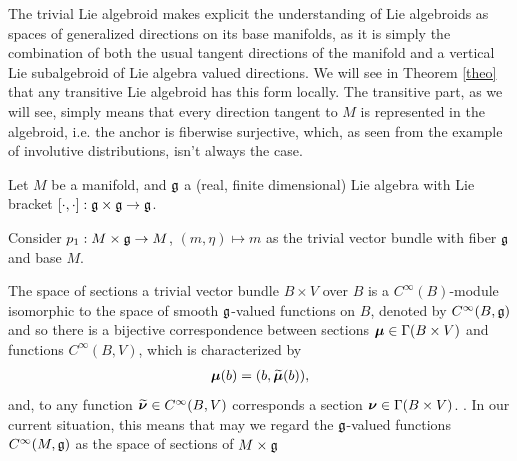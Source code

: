 The trivial Lie algebroid makes explicit the understanding of Lie algebroids as spaces of generalized directions on its base manifolds, as it is simply the combination of both the usual tangent directions of the manifold and a vertical Lie subalgebroid of Lie algebra valued directions. We will see in Theorem \ref{theo} that any transitive Lie algebroid has this form locally. The transitive part, as we will see, simply means that every direction tangent to $M$ is represented in the algebroid, i.e. the anchor is fiberwise surjective, which, as seen from the example of involutive distributions, isn't always the case.

Let $M$ be a manifold, and $\mathfrak{g}$ a (real, finite dimensional) Lie algebra with Lie bracket $[\cdot , \cdot]: \mathfrak{g} \times \mathfrak{g} \to \mathfrak{g}$.

Consider $p_1: M \times \mathfrak{g} \to M$, $(m, \eta) \mapsto m$ as the trivial vector bundle with fiber $\mathfrak{g}$ and base $M$. %

The space of sections a trivial vector bundle $B \times V$ over $B$ is a $C^\infty(B)$-module isomorphic to the space of smooth $\mathfrak{g}$-valued functions on $B$, denoted by \emph{$C^\infty(B, \mathfrak{g})$} and so 
there is a bijective correspondence between sections $\bm{\mu} \in \Gamma(B \times V)$ and functions $C^\infty(B, V)$, which is characterized by
\begin{align} \label{defnTildeSect}
    \bm{\mu}(b) = (b, \widetilde{\bm{\mu}}(b)),
\end{align} and, to any function $\widetilde{\bm{\nu}} \in C^\infty(B, V)$ corresponds a section $\bm{\nu} \in \Gamma(B \times V)$. . In our current situation, this means that may we regard the $\mathfrak{g}$-valued functions $C^\infty(M, \mathfrak{g})$ as the space of sections of $M \times \mathfrak{g}$

